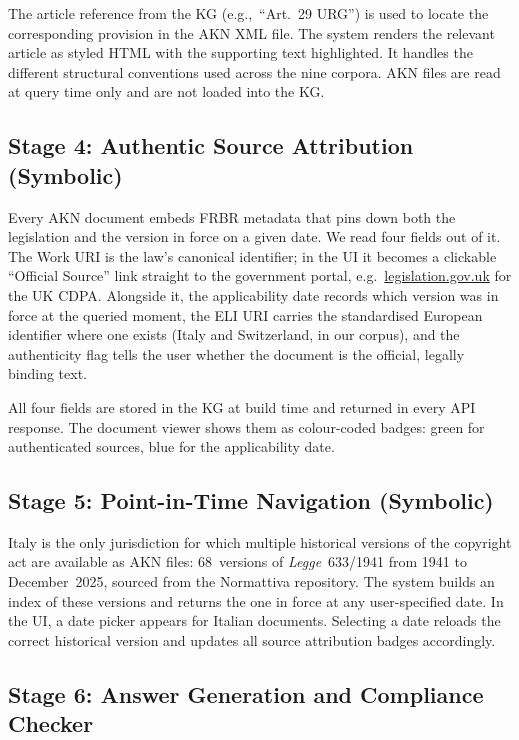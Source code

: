 \documentclass[12pt,a4paper]{article}
\begin{document}
The article reference from the KG (e.g.,\ ``Art.~29 URG'') is used to
locate the corresponding provision in the AKN XML file. The system
renders the relevant article as styled HTML with the supporting text
highlighted. It handles the different structural conventions used across
the nine corpora. AKN files are read at query time only and are not
loaded into the KG.

\subsection{Stage 4: Authentic Source Attribution (Symbolic)}
\label{sec:frbr}

Every AKN document embeds FRBR metadata that pins down both the
legislation and the version in force on a given date. We read four fields
out of it. The Work URI is the law's canonical identifier; in
the UI it becomes a clickable ``Official Source'' link straight to the
government portal, e.g.\ \href{https://www.legislation.gov.uk/ukpga/1988/48}%
{legislation.gov.uk} for the UK CDPA. Alongside it, the
applicability date records which version was in force at the
queried moment, the ELI URI carries the standardised European
identifier where one exists (Italy and Switzerland, in our corpus), and
the authenticity flag tells the user whether the document is the
official, legally binding text.

All four fields are stored in the KG at build time and returned in every
API response. The document viewer shows them as colour-coded badges:
green for authenticated sources, blue for the applicability date.

\subsection{Stage 5: Point-in-Time Navigation (Symbolic)}
\label{sec:pit}

Italy is the only jurisdiction for which multiple historical versions of
the copyright act are available as AKN files: 68~versions of
\emph{Legge}~633/1941 from 1941 to December~2025, sourced from the
Normattiva repository. The system builds an index of these versions and
returns the one in force at any user-specified date. In the UI, a date
picker appears for Italian documents. Selecting a date reloads the
correct historical version and updates all source attribution badges
accordingly.

\subsection{Stage 6: Answer Generation and Compliance Checker}
\end{document}
